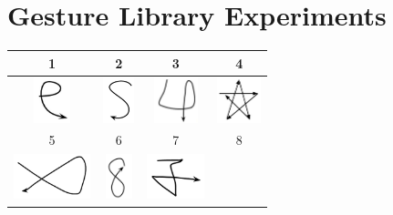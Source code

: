 


\section{Gesture Library Experiments}
\label{sec:GestureLibrary}

\begin{table}

\begin{center}
  \begin{tabular}{ c | c | c | c  }
    \hline
    1 & 2 & 3 & 4  \\ \hline
    \includegraphics[width=0.2\linewidth, height=13mm]{./figures/gesture_e.png} & 
    \includegraphics[width=0.2\linewidth, height=13mm]{./figures/gesture_s.png} &
    \includegraphics[width=0.2\linewidth, height=13mm]{./figures/gesture_num4.png} &
    \includegraphics[width=0.2\linewidth, height=13mm]{./figures/gesture_star.png}  \\ \hline
    5 & 6 & 7 & 8 	 \\ \hline
    \includegraphics[width=0.2\linewidth, height=13mm]{./figures/gesture_5.png} &
    \includegraphics[width=0.2\linewidth, height=13mm]{./figures/gesture_num8.png} &
    \includegraphics[width=0.2\linewidth, height=13mm]{./figures/gesture_7.png} &

\end{tabular}
\end{center}
\end{table}

